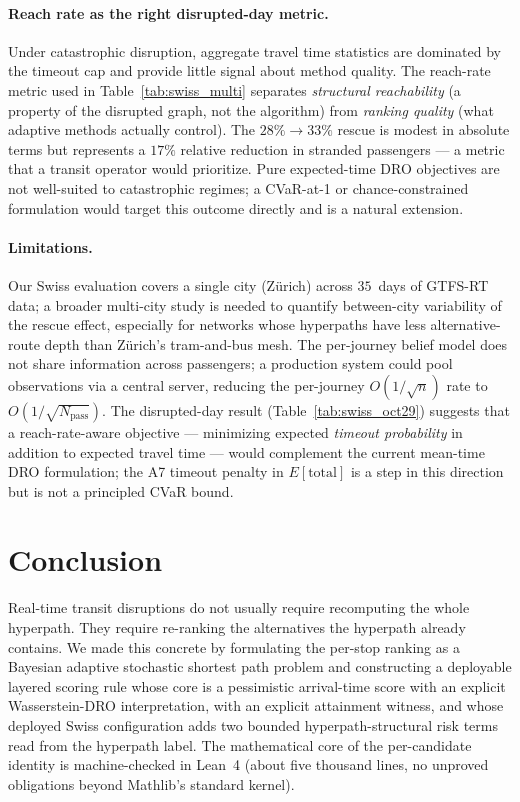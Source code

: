 \documentclass[11pt]{article}
\theoremstyle{definition}
\theoremstyle{remark}
\begin{document}
\paragraph{Reach rate as the right disrupted-day metric.}
Under catastrophic disruption, aggregate travel time statistics are
dominated by the timeout cap and provide little signal about method
quality. The reach-rate metric used in Table~\ref{tab:swiss_multi}
separates \emph{structural reachability} (a property of the disrupted
graph, not the algorithm) from \emph{ranking quality} (what
adaptive methods actually control). The $28\%\to 33\%$ rescue is modest
in absolute terms but represents a $17\%$ relative reduction in
stranded passengers --- a metric that a transit operator would
prioritize. Pure expected-time DRO objectives are not well-suited to
catastrophic regimes; a CVaR-at-1 or
chance-constrained~\cite{chow2015} formulation would target this
outcome directly and is a natural extension.

\paragraph{Limitations.}
Our Swiss evaluation covers a single city (Zürich) across $35$~days
of GTFS-RT data; a broader multi-city study is needed to quantify
between-city variability of the rescue effect, especially for
networks whose hyperpaths have less alternative-route depth than
Zürich's tram-and-bus mesh. The per-journey belief model does not
share information across passengers; a production system could pool
observations via a central server, reducing the per-journey
$O(1/\sqrt n)$ rate to $O(1/\sqrt{N_{\mathrm{pass}}})$. The
disrupted-day result (Table~\ref{tab:swiss_oct29}) suggests that a
reach-rate-aware objective --- minimizing expected \emph{timeout
probability} in addition to expected travel time --- would
complement the current mean-time DRO formulation; the A7 timeout
penalty in $E[\mathrm{total}]$ is a step in this direction but is
not a principled CVaR bound.

\section{Conclusion}
\label{sec:conclusion}

Real-time transit disruptions do not usually require recomputing the whole hyperpath. They require re-ranking the alternatives the hyperpath already contains. We made this concrete by formulating the per-stop ranking as a Bayesian adaptive stochastic shortest path problem and constructing a deployable layered scoring rule whose core is a pessimistic arrival-time score with an explicit Wasserstein-DRO interpretation, with an explicit attainment witness, and whose deployed Swiss configuration adds two bounded hyperpath-structural risk terms read from the hyperpath label. The mathematical core of the per-candidate identity is machine-checked in Lean~4 (about five thousand lines, no unproved obligations beyond Mathlib's standard kernel).
\end{document}
